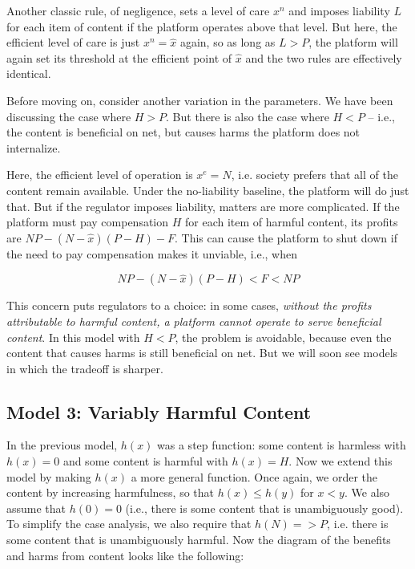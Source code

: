 Another classic rule, of negligence, sets a level of care $x^n$ and imposes liability $L$ for each item of content if the platform operates above that level. But here, the efficient level of care is just $x^n = \hat{x}$ again, so as long as $L>P$, the platform will again set its threshold at the efficient point of $\hat{x}$ and the two rules are effectively identical.

Before moving on, consider another variation in the parameters. We have been discussing the case where $H > P$. But there is also the case where $H < P$ -- i.e., the content is beneficial on net, but causes harms the platform does not internalize.


Here, the efficient level of operation is $x^e = N$, i.e. society prefers that all of the content remain available. Under the no-liability baseline, the platform will do just that. But if the regulator imposes liability, matters are more complicated. If the platform must pay compensation $H$ for each item of harmful content, its profits are $NP - (N - \hat{x})(P - H) - F $. This can cause the platform to shut down if the need to pay compensation makes it unviable, i.e., when 

\begin{equation}
NP - (N - \hat{x})(P - H) < F <  NP
\end{equation}


This concern puts regulators to a choice: in some cases, \emph{without the profits attributable to harmful content, a platform cannot operate to serve beneficial content}. In this model with $H < P$, the problem is avoidable, because even the content that causes harms is still beneficial on net. But we will soon see models in which the tradeoff is sharper.


\subsection{Model 3: Variably Harmful Content}

In the previous model, $h(x)$ was a step function: some content is harmless with $h(x) = 0$ and some content is harmful with $h(x) = H$. Now we extend this model by making $h(x)$ a more general function. Once again, we order the content by increasing harmfulness, so that $h(x) \le h(y)$ for $x < y$. We also assume that $h(0) =0$ (i.e., there is some content that is unambiguously good). To simplify the case analysis, we also require that $h(N) => P$, i.e. there is some content that is unambiguously harmful. Now the diagram of the benefits and harms from content looks like the following:

